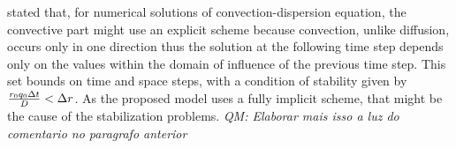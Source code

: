 
{\tred \citeonline[roose2009] stated that, for numerical solutions of convection-dispersion equation, the convective part might use an explicit scheme because convection, unlike diffusion, occurs only in one direction thus the solution at the following time step depends only on the values within the domain of influence of the previous time step. This set bounds on time and space steps, with a condition of stability given by ${r_0 q_0 \Delta t \over D} < \Delta r$. As the proposed model uses a fully implicit scheme, that might be the cause of the stabilization problems. 
{\it QM: Elaborar mais isso a luz do comentario no paragrafo anterior}}





